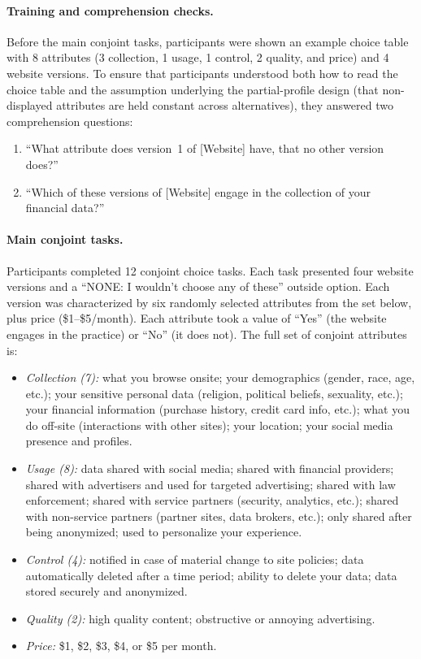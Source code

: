 \documentclass[12pt]{article}
\theoremstyle{definition}
\theoremstyle{remark}
\begin{document}
\begin{appendix}
\paragraph{Training and comprehension checks.} Before the main conjoint tasks, participants were shown an example choice table with 8 attributes (3 collection, 1 usage, 1 control, 2 quality, and price) and 4 website versions. To ensure that participants understood both how to read the choice table and the assumption underlying the partial-profile design (that non-displayed attributes are held constant across alternatives), they answered two comprehension questions:
\begin{enumerate}[leftmargin=2em,itemsep=1pt]
    \item ``What attribute does version~1 of [Website] have, that no other version does?''
    \item ``Which of these versions of [Website] engage in the collection of your financial data?''
\end{enumerate}

\paragraph{Main conjoint tasks.} Participants completed 12 conjoint choice tasks. Each task presented four website versions and a ``NONE: I wouldn't choose any of these'' outside option. Each version was characterized by six randomly selected attributes from the set below, plus price (\$1--\$5/month). Each attribute took a value of ``Yes'' (the website engages in the practice) or ``No'' (it does not). The full set of conjoint attributes is:

\begin{itemize}[leftmargin=*,itemsep=1pt]
    \item \emph{Collection (7):} what you browse onsite; your demographics (gender, race, age, etc.); your sensitive personal data (religion, political beliefs, sexuality, etc.); your financial information (purchase history, credit card info, etc.); what you do off-site (interactions with other sites); your location; your social media presence and profiles.
    \item \emph{Usage (8):} data shared with social media; shared with financial providers; shared with advertisers and used for targeted advertising; shared with law enforcement; shared with service partners (security, analytics, etc.); shared with non-service partners (partner sites, data brokers, etc.); only shared after being anonymized; used to personalize your experience.
    \item \emph{Control (4):} notified in case of material change to site policies; data automatically deleted after a time period; ability to delete your data; data stored securely and anonymized.
    \item \emph{Quality (2):} high quality content; obstructive or annoying advertising.
    \item \emph{Price:} \$1, \$2, \$3, \$4, or \$5 per month.
\end{itemize}


\end{appendix}
\end{document}
